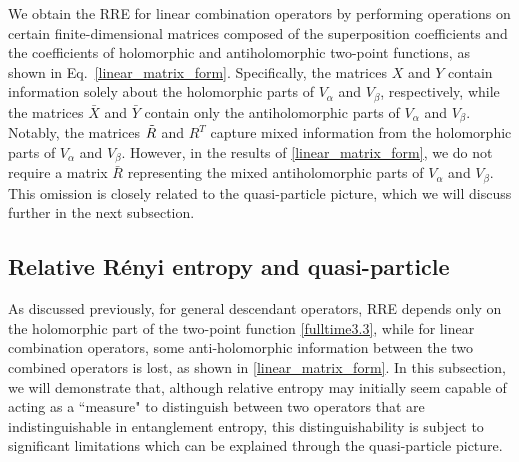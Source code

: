 \documentclass[12pt]{article}
\begin{document}
We obtain the RRE for linear combination operators by performing operations on certain finite-dimensional matrices composed of the superposition coefficients and the coefficients of holomorphic and antiholomorphic two-point functions, as shown in Eq.~\eqref{linear_matrix_form}. Specifically, the matrices \( X \) and \( Y \) contain information solely about the holomorphic parts of \( V_\alpha \) and \( V_\beta \), respectively, while the matrices \( \bar{X} \) and \( \bar{Y} \) contain only the antiholomorphic parts of \( V_\alpha \) and \( V_\beta \). Notably, the matrices \( \Tilde{R} \) and \( R^{T} \) capture mixed information from the holomorphic parts of \( V_\alpha \) and \( V_\beta \). However, in the results of \eqref{linear_matrix_form}, we do not require a matrix \( \bar{R} \) representing the mixed antiholomorphic parts of \( V_\alpha \) and \( V_\beta \). This omission is closely related to the quasi-particle picture, which we will discuss further in the next subsection.

\subsection{Relative R\'enyi entropy and quasi-particle}\label{subsection4.1}
As discussed previously, for general descendant operators, RRE depends only on the holomorphic part of the two-point function \eqref{fulltime3.3}, while for linear combination operators, some anti-holomorphic information between the two combined operators is lost, as shown in \eqref{linear_matrix_form}. In this subsection, we will demonstrate that, although relative entropy may initially seem capable of acting as a ``measure" to distinguish between two operators that are indistinguishable in entanglement entropy, this distinguishability is subject to significant limitations which can be explained through the quasi-particle picture.
\end{document}
